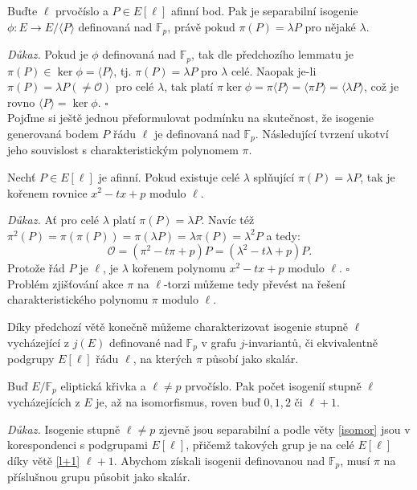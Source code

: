 \documentclass[12pt]{report}
\begin{document}
\begin{dusledek}
Buďte $\ell$ prvočíslo a $P \in E[\ell]$ afinní bod. Pak je separabilní isogenie $\phi : E \longrightarrow E/\langle P \rangle$ definovaná nad $\mathbb{F}_p$, právě pokud $\pi (P) = \lambda P$ pro nějaké $\lambda$.
\end{dusledek}
\noindent \textit{Důkaz.} Pokud je $\phi$ definovaná nad $\mathbb{F}_p$, tak dle předchozího lemmatu je $\pi (P) \in \ker \phi = \langle P \rangle$, tj. $\pi (P) = \lambda P$ pro $\lambda$ celé. Naopak je-li $\pi(P) = \lambda P (\neq \mathcal{O})$ pro celé $\lambda$, tak platí $\pi \ker \phi = \pi \langle P \rangle = \langle \pi P \rangle = \langle \lambda P \rangle$, což je rovno $\langle P \rangle = \ker \phi$. \hfill $\square$\\

Pojďme si ještě jednou přeformulovat podmínku na skutečnost, že isogenie generovaná bodem $P$ řádu $\ell$ je definovaná nad $\mathbb{F}_p$. Následující tvrzení ukotví jeho souvislost s charakteristickým polynomem $\pi$.

\begin{lemma}
Nechť $P \in E[\ell]$ je afinní. Pokud existuje celé $\lambda$ splňující $\pi (P) = \lambda P$, tak je kořenem rovnice $x^2 - tx + p$ modulo $\ell$. 
\end{lemma}
\noindent \textit{Důkaz.} Ať pro celé $\lambda$ platí $\pi(P) = \lambda P$. Navíc též $\pi^2 (P) = \pi(\pi (P)) = \pi(\lambda P) = \lambda \pi(P) = \lambda^2 P$ a tedy:
\begin{equation*}
\mathcal{O} = (\pi^2 - t \pi + p)P = (\lambda ^ 2 - t \lambda + p)P.
\end{equation*}
Protože řád $P$ je $\ell$, je $\lambda$ kořenem polynomu $x^2 - tx + p$ modulo $\ell$. \hfill $\square$\\


Problém zjišťování akce $\pi$ na $\ell$-torzi můžeme tedy převést na řešení charakteristického polynomu $\pi$ modulo $\ell$. 

Díky předchozí větě konečně můžeme charakterizovat isogenie stupně $\ell$ vycházející z $j(E)$ definované nad $\mathbb{F}_p$ v grafu $j$-invariantů, či ekvivalentně podgrupy $E[\ell]$ řádu $\ell$, na kterých $\pi$ působí jako skalár.

\begin{veta}
Buď $E/\mathbb{F}_p$ eliptická křivka a $\ell \neq p$ prvočíslo. Pak počet isogenií stupně $\ell$ vycházejících z $E$ je, až na isomorfismus, roven buď $0,1,2$ či $\ell+1$. 
\end{veta}
\noindent \textit{Důkaz.} Isogenie stupně $\ell \neq p$ zjevně jsou separabilní a podle věty \ref{isomor} jsou v korespondenci s podgrupami $E[\ell]$, přičemž takových grup je na celé $E[\ell]$ díky větě \ref{l+1} $\ell+1$. Abychom získali isogenii definovanou nad $\mathbb{F}_p$, musí $\pi$ na příslušnou grupu působit jako skalár. 
\end{document}
